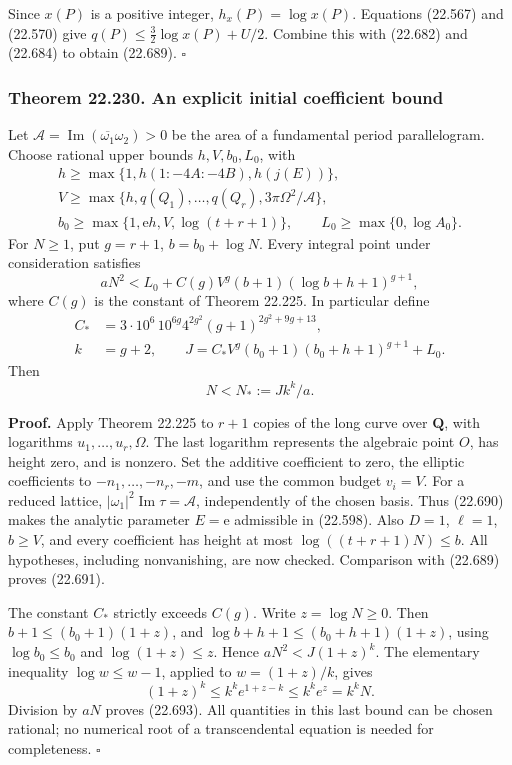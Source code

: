 \documentclass[
  11pt,
  a4paper,
]{article}
\begin{document}
Since \(x(P)\) is a positive integer, \(h_x(P)=\log x(P)\). Equations
(22.567) and (22.570) give \(q(P)\le\tfrac32\log x(P)+U/2\). Combine
this with (22.682) and (22.684) to obtain (22.689). \(\square\)

\subsubsection{Theorem 22.230. An explicit initial coefficient
bound}\label{theorem-22.230.-an-explicit-initial-coefficient-bound}

Let \(\mathcal A=\operatorname{Im}(\overline{\omega_1}\omega_2)>0\) be
the area of a fundamental period parallelogram. Choose rational upper
bounds \(h,V,b_0,L_0\), with \[
\begin{gathered}
 h\ge\max\{1,h(1:-4A:-4B),h(j(E))\},\\
 V\ge\max\{h,q(Q_1),\ldots,q(Q_r),3\pi\Omega^2/\mathcal A\},\\
 b_0\ge\max\{1,\mathrm e h,V,\log(t+r+1)\},\qquad
 L_0\ge\max\{0,\log A_0\}.
\end{gathered}
\tag{22.690}
\] For \(N\ge1\), put \(g=r+1\), \(b=b_0+\log N\). Every integral point
under consideration satisfies \[
 aN^2<L_0+C(g)V^g(b+1)(\log b+h+1)^{g+1},
 \tag{22.691}
\] where \(C(g)\) is the constant of Theorem 22.225. In particular
define \[
\begin{split}
 C_*&=3\cdot10^6\,10^{6g}4^{2g^2}
                  (g+1)^{2g^2+9g+13},\\
 k&=g+2,\qquad
 J=C_*V^g(b_0+1)(b_0+h+1)^{g+1}+L_0.
\end{split}
\tag{22.692}
\] Then \[
 N<N_*:=Jk^k/a.
 \tag{22.693}
\]

\textbf{Proof.} Apply Theorem 22.225 to \(r+1\) copies of the long curve
over \(\mathbf Q\), with logarithms \(u_1,\ldots,u_r,\Omega\). The last
logarithm represents the algebraic point \(O\), has height zero, and is
nonzero. Set the additive coefficient to zero, the elliptic coefficients
to \(-n_1,\ldots,-n_r,-m\), and use the common budget \(v_i=V\). For a
reduced lattice, \(|\omega_1|^2\operatorname{Im}\tau=\mathcal A\),
independently of the chosen basis. Thus (22.690) makes the analytic
parameter \(E=\mathrm e\) admissible in (22.598). Also \(D=1\),
\(\ell=1\), \(b\ge V\), and every coefficient has height at most
\(\log((t+r+1)N)\le b\). All hypotheses, including nonvanishing, are now
checked. Comparison with (22.689) proves (22.691).

The constant \(C_*\) strictly exceeds \(C(g)\). Write \(z=\log N\ge0\).
Then \(b+1\le(b_0+1)(1+z)\), and \(\log b+h+1\le(b_0+h+1)(1+z)\), using
\(\log b_0\le b_0\) and \(\log(1+z)\le z\). Hence \(aN^2<J(1+z)^k\). The
elementary inequality \(\log w\le w-1\), applied to \(w=(1+z)/k\), gives
\[
 (1+z)^k\le k^k e^{1+z-k}\le k^k e^z=k^kN.
 \tag{22.694}
\] Division by \(aN\) proves (22.693). All quantities in this last bound
can be chosen rational; no numerical root of a transcendental equation
is needed for completeness. \(\square\)
\end{document}

